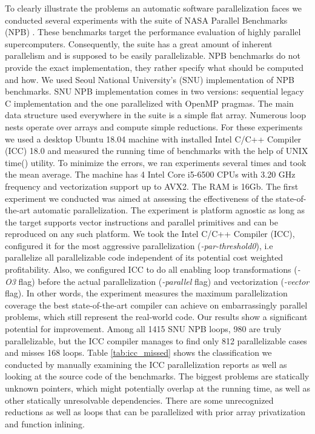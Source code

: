 \quad To clearly illustrate the problems an automatic software parallelization faces we conducted several experiments with the suite of NASA Parallel Benchmarks (NPB) \cite{nasa-parallel-benchmarks}. These benchmarks target the performance evaluation of highly parallel supercomputers. Consequently, the suite has a great amount of inherent parallelism and is supposed to be easily parallelizable. NPB benchmarks do not provide the exact implementation, they rather specify what should be computed and how. We used Seoul National University's (SNU) implementation \cite{snu-npb-benchmarks} of NPB benchmarks. SNU NPB implementation comes in two versions: sequential legacy C implementation and the one parallelized with OpenMP pragmas. The main data structure used everywhere in the suite is a simple flat array. Numerous loop nests operate over arrays and compute simple reductions.\newline\null
\quad For these experiments we used a desktop Ubuntu 18.04 machine with installed Intel C/C++ Compiler (ICC) 18.0 and measured the running time of benchmarks with the help of UNIX time() utility. To minimize the errors, we ran experiments several times and took the mean average. The machine has 4 Intel Core i5-6500 CPUs with 3.20 GHz frequency and vectorization support up to AVX2. The RAM is 16Gb.\newline\null
\quad The first experiment we conducted was aimed at assessing the effectiveness of the state-of-the-art automatic parallelization. The experiment is platform agnostic as long as the target supports vector instructions and parallel primitives and can be reproduced on any such platform. We took the Intel C/C++ Compiler (ICC), configured it for the most aggressive parallelization (\textit{-par-threshold0}), i.e parallelize all parallelizable code independent of its potential cost weighted profitability. Also, we configured ICC to do all enabling loop transformations (\textit{-O3} flag) before the actual parallelization (\textit{-parallel} flag) and vectorization (\textit{-vector} flag). In other words, the experiment measures the maximum parallelization coverage the best state-of-the-art compiler can achieve on embarrassingly parallel problems, which still represent the real-world code. Our results show a significant potential for improvement. Among all 1415 SNU NPB loops, 980 are truly parallelizable, but the ICC compiler manages to find only 812 parallelizable cases and misses 168 loops. Table \ref{tab:icc_missed} shows the classification we conducted by manually examining the ICC parallelization reports as well as looking at the source code of the benchmarks. The biggest problems are statically unknown pointers, which might potentially overlap at the running time, as well as other statically unresolvable dependencies. There are some unrecognized reductions as well as loops that can be parallelized with prior array privatization and function inlining.
